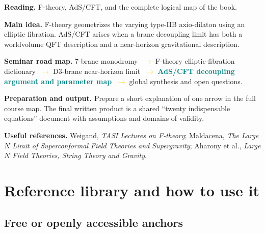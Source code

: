 \documentclass[11pt]{article}
\newcommand{\essential}[1]{\textcolor{teal}{\textbf{#1}}}
\newcommand{\roadarrow}{\textcolor{gold}{\ensuremath{\;\longrightarrow\;}}}
\newcommand{\seminarweek}[7]{%
  \begin{tcolorbox}[
    enhanced,
    colback=white,colframe=navy,
    boxrule=0.65pt,arc=1.5mm,
    left=3mm,right=3mm,top=2mm,bottom=2mm,
    title={#1\hfill\normalfont #2},
    fonttitle=\bfseries,coltitle=white,colbacktitle=navy
  ]
  \textbf{Reading.} #3

  \textbf{Main idea.} #4

  \textbf{Seminar road map.} #5

  \textbf{Preparation and output.} #6

  \textbf{Useful references.} #7
  \end{tcolorbox}
}
\begin{document}
\seminarweek{Week 28}{Ch.~18.8--18.9, pp.~724--774; global synthesis}
{F-theory, AdS/CFT, and the complete logical map of the book.}
{F-theory geometrizes the varying type-IIB axio-dilaton using an elliptic
fibration.  AdS/CFT arises when a brane decoupling limit has both a worldvolume
QFT description and a near-horizon gravitational description.}
{7-brane monodromy \roadarrow F-theory elliptic-fibration dictionary
\roadarrow D3-brane near-horizon limit \roadarrow \essential{AdS/CFT
decoupling argument and parameter map} \roadarrow global synthesis and open
questions.}
{Prepare a short explanation of one arrow in the full course map.  The
final written product is a shared ``twenty indispensable equations'' document
with assumptions and domains of validity.}
{Weigand, \emph{TASI Lectures on F-theory}; Maldacena, \emph{The Large $N$
Limit of Superconformal Field Theories and Supergravity}; Aharony et al.,
\emph{Large $N$ Field Theories, String Theory and Gravity}.}

\section{Reference library and how to use it}

\subsection{Free or openly accessible anchors}
\end{document}
